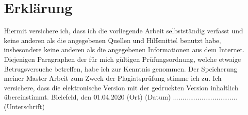 \documentclass[
        ngerman,
        paper=a4,
        numbers=noendperiod,
]{scrreprt}
\begin{document}
\chapter*{Erklärung}
Hiermit versichere ich, dass ich die vorliegende Arbeit selbstständig verfasst und keine anderen als die angegebenen Quellen und Hilfsmittel benutzt habe, insbesondere keine anderen als die angegebenen Informationen aus dem Internet. Diejenigen Paragraphen der für mich gültigen Prüfungsordnung, welche etwaige Betrugsversuche betreffen, habe ich zur Kenntnis genommen. Der Speicherung meiner Master-Arbeit zum Zweck der Plagiatsprüfung stimme ich zu. Ich versichere, dass die elektronische Version mit der gedruckten Version inhaltlich übereinstimmt.\newline
\linebreak
\linebreak
\linebreak
Bielefeld, den 01.04.2020\newline
(Ort) (Datum)\newline
\linebreak
\linebreak
\linebreak
..................................\newline
(Unterschrift)
\end{document}
